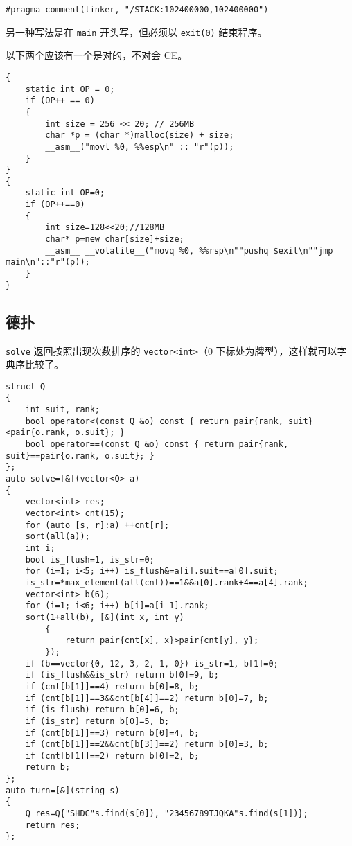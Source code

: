 \documentclass[12pt]{ctexart}
\begin{document}
\begin{lstlisting}
#pragma comment(linker, "/STACK:102400000,102400000")
\end{lstlisting}

另一种写法是在 \verb|main| 开头写，但必须以 \verb|exit(0)| 结束程序。

以下两个应该有一个是对的，不对会 CE。

\begin{lstlisting}
{
	static int OP = 0;
	if (OP++ == 0)
	{
		int size = 256 << 20; // 256MB
		char *p = (char *)malloc(size) + size;
		__asm__("movl %0, %%esp\n" :: "r"(p));
	}
}
{
	static int OP=0;
	if (OP++==0)
	{
		int size=128<<20;//128MB
		char* p=new char[size]+size;
		__asm__ __volatile__("movq %0, %%rsp\n""pushq $exit\n""jmp main\n"::"r"(p));
	}
}
\end{lstlisting}

\subsection{德扑}

\verb|solve| 返回按照出现次数排序的 \verb|vector<int>|（$0$ 下标处为牌型），这样就可以字典序比较了。

\begin{lstlisting}
struct Q
{
	int suit, rank;
	bool operator<(const Q &o) const { return pair{rank, suit}<pair{o.rank, o.suit}; }
	bool operator==(const Q &o) const { return pair{rank, suit}==pair{o.rank, o.suit}; }
};
auto solve=[&](vector<Q> a)
{
	vector<int> res;
	vector<int> cnt(15);
	for (auto [s, r]:a) ++cnt[r];
	sort(all(a));
	int i;
	bool is_flush=1, is_str=0;
	for (i=1; i<5; i++) is_flush&=a[i].suit==a[0].suit;
	is_str=*max_element(all(cnt))==1&&a[0].rank+4==a[4].rank;
	vector<int> b(6);
	for (i=1; i<6; i++) b[i]=a[i-1].rank;
	sort(1+all(b), [&](int x, int y)
		{
			return pair{cnt[x], x}>pair{cnt[y], y};
		});
	if (b==vector{0, 12, 3, 2, 1, 0}) is_str=1, b[1]=0;
	if (is_flush&&is_str) return b[0]=9, b;
	if (cnt[b[1]]==4) return b[0]=8, b;
	if (cnt[b[1]]==3&&cnt[b[4]]==2) return b[0]=7, b;
	if (is_flush) return b[0]=6, b;
	if (is_str) return b[0]=5, b;
	if (cnt[b[1]]==3) return b[0]=4, b;
	if (cnt[b[1]]==2&&cnt[b[3]]==2) return b[0]=3, b;
	if (cnt[b[1]]==2) return b[0]=2, b;
	return b;
};
auto turn=[&](string s)
{
	Q res=Q{"SHDC"s.find(s[0]), "23456789TJQKA"s.find(s[1])};
	return res;
};
\end{lstlisting}
\end{document}
